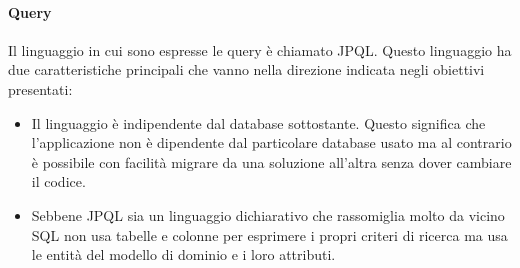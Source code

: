 \paragraph{Query}
Il linguaggio in cui sono espresse le query è chiamato JPQL. Questo linguaggio ha due caratteristiche principali che vanno nella direzione indicata negli obiettivi presentati:

\begin{itemize}
 \item Il linguaggio è indipendente dal database sottostante. Questo significa che l'applicazione non è dipendente dal particolare database usato ma al contrario è possibile con facilità migrare da una soluzione all'altra senza dover cambiare
  il codice.
  \item Sebbene JPQL sia un linguaggio dichiarativo che rassomiglia molto da vicino SQL non usa tabelle e colonne per esprimere i propri criteri di ricerca ma usa le entità del modello di dominio e i loro attributi.
\end{itemize}



